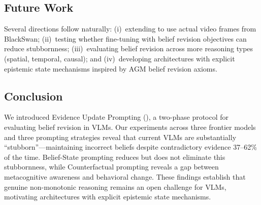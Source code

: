 \subsection{Future Work}

Several directions follow naturally: (i)~extending \method to use actual video frames from BlackSwan; (ii)~testing whether fine-tuning with belief revision objectives can reduce stubbornness; (iii)~evaluating belief revision across more reasoning types (spatial, temporal, causal); and (iv)~developing architectures with explicit epistemic state mechanisms inspired by AGM belief revision axioms.

\subsection{Conclusion}

We introduced Evidence Update Prompting (\method), a two-phase protocol for evaluating belief revision in VLMs.  Our experiments across three frontier models and three prompting strategies reveal that current VLMs are substantially ``stubborn''---maintaining incorrect beliefs despite contradictory evidence 37--62\% of the time.  Belief-State prompting reduces but does not eliminate this stubbornness, while Counterfactual prompting reveals a gap between metacognitive awareness and behavioral change.  These findings establish that genuine non-monotonic reasoning remains an open challenge for VLMs, motivating architectures with explicit epistemic state mechanisms.
